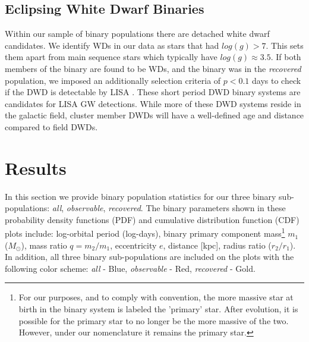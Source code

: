 \documentclass[twocolumn]{aastex63}
\begin{document}
\subsection{Eclipsing White Dwarf Binaries} \label{subsec:wd}

Within our sample of binary populations there are detached white dwarf candidates. 
We identify WDs in our data as stars that had $log(g) > 7$. This sets them apart from main sequence stars which typically have $log(g) \approx 3.5$. If both members of the binary are found to be WDs, and the binary was in the \textit{recovered} population, we imposed an additionally selection criteria of $p < 0.1$ days to check if the DWD is detectable by LISA \citep{2017MNRAS.470.1894K}. These short period DWD binary systems are candidates for LISA GW detections. While more of these DWD systems reside in the galactic field, cluster member DWDs will have a well-defined age and distance compared to field DWDs. 


\section{Results} \label{sec:Results}
In this section we provide binary population statistics for our three binary sub-populations: \textit{all}, \textit{observable}, \textit{recovered}. The binary parameters shown in these probability density functions (PDF) and cumulative distribution function (CDF) plots include: log-orbital period (log-days), binary primary component mass\footnote{For our purposes, and to comply with convention, the more massive star  at birth in the binary system is labeled the 'primary' star. After evolution, it is possible for the primary star to no longer be the more massive of the two. However, under our nomenclature it remains the primary star.} \textit{$m_1$} ($M_{\odot}$), mass ratio $q=m_2/m_1$, eccentricity $e$, distance [kpc], radius ratio ($r_2/r_1$). In addition, all three binary sub-populations are included on the plots with the following color scheme: \textit{all} - Blue, \textit{observable} - Red, \textit{recovered} - Gold.
\end{document}

